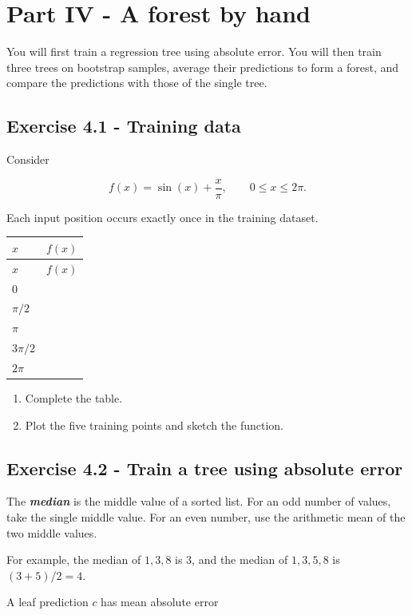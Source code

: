 \documentclass{course_sheet}
\begin{document}
\section*{Part IV - A forest by hand}
You will first train a regression tree using absolute error. You will then train three trees on bootstrap samples, average their predictions to form a forest, and compare the predictions with those of the single tree.

\subsection*{Exercise 4.1 - Training data}
Consider

\[
f(x)=\sin(x)+\frac{x}{\pi},\qquad 0\leq x\leq2\pi.
\]

Each input position occurs exactly once in the training dataset.

\begingroup
\small
\setlength{\tabcolsep}{4pt}
\begin{longtable}{l|l}
$x$ & $f(x)$ \\
\hline
\endfirsthead
$x$ & $f(x)$ \\
\hline
\endhead
$0$ & $\phantom{0}$ \\[3pt]
$\pi/2$ & $\phantom{0}$ \\[3pt]
$\pi$ & $\phantom{0}$ \\[3pt]
$3\pi/2$ & $\phantom{0}$ \\[3pt]
$2\pi$ & $\phantom{0}$ \\[3pt]
\end{longtable}
\endgroup
\begin{enumerate}
\item
Complete the table.

\item
Plot the five training points and sketch the function.

\end{enumerate}
\subsection*{Exercise 4.2 - Train a tree using absolute error}
The \textbf{\textit{median}} is the middle value of a sorted list. For an odd number of values, take the single middle value. For an even number, use the arithmetic mean of the two middle values.

For example, the median of $1,3,8$ is $3$, and the median of $1,3,5,8$ is $(3+5)/2=4$.

A leaf prediction $c$ has mean absolute error
\end{document}
